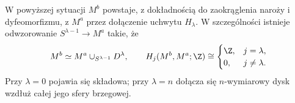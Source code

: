 \begin{twierdzenie}
\label{thm:uchwyt-morse-17}
W powyższej sytuacji $M^b$ powstaje,
z dokładnością do zaokrąglenia naroży
i dyfeomorfizmu, z $M^a$ przez
dołączenie uchwytu $H_\lambda$.
W szczególności istnieje odwzorowanie
$S^{\lambda-1}\to M^a$ takie, że
\begin{equation}\label{eq:komorka-morse-17}
 M^b\simeq M^a\cup_{S^{\lambda-1}}D^\lambda,
 \qquad
 H_j(M^b,M^a;\Z)\cong
 \begin{cases}\Z,&j=\lambda,\\0,&j\ne\lambda.
 \end{cases}
\end{equation}
Przy $\lambda=0$ pojawia się składowa;
przy $\lambda=n$ dołącza się
$n$-wymiarowy dysk wzdłuż całej
jego sfery brzegowej.
\end{twierdzenie}
